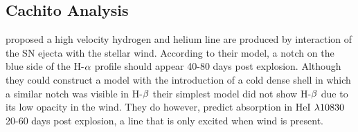 \documentclass[a4paper,fleqn,usenatbib]{mnras}
\begin{document}
\subsection{Cachito Analysis} \label{sec:cachito}
\citet{2007chugai} proposed a high velocity hydrogen and helium line are produced by interaction of the SN ejecta with the stellar wind. 
According to their model, a notch on the blue side of the H-$\rm{\alpha}$ profile should appear 40-80 days post explosion.
Although they could construct a model with the introduction of a cold dense shell in which a similar notch was visible in H-$\rm{\beta}$ their simplest model did not show H-$\rm{\beta}$ due to its low opacity in the wind.
They do however, predict absorption in HeI $\rm{\lambda10830}$ 20-60 days post explosion, a line that is only excited when wind is present. 
\end{document}

